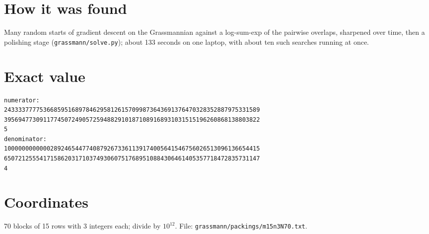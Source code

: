 \documentclass[11pt,a4paper]{article}
\begin{document}
\section{How it was found}
Many random starts of gradient descent on the Grassmannian against a log-sum-exp of the pairwise overlaps, sharpened over time, then a polishing stage (\texttt{grassmann/solve.py}); about 133 seconds on one laptop, with about ten such searches running at once.


\appendix
\section{Exact value}
{\small
\begin{verbatim}
numerator:
243333777753668595168978462958126157099873643691376470328352887975331589
395694773091177450724905725948829101871089168931031515196260868138803822
5
denominator:
100000000000028924654477408792673361139174005641546756026513096136654415
650721255541715862031710374930607517689510884306461405357718472835731147
4
\end{verbatim}}

\section{Coordinates}
70 blocks of 15 rows with 3 integers each; divide by $10^{12}$. File: \texttt{grassmann/packings/m15n3N70.txt}.
{\tiny
\begin{multicols}{3}
\end{multicols}}
\end{document}
